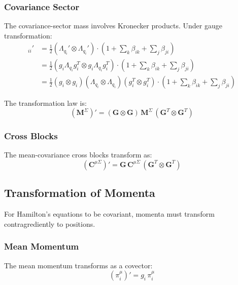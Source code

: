 \documentclass[12pt]{article}
\begin{document}
\subsubsection{Covariance Sector}

The covariance-sector mass involves Kronecker products. Under gauge transformation:
\begin{align}
[\mathbf{M}^\Sigma]_{ii}' &= \frac{1}{2}(\Lambda_{q_i}' \otimes \Lambda_{q_i}') \cdot \left(1 + \sum_k \beta_{ik} + \sum_j \beta_{ji}\right) \nonumber\\
&= \frac{1}{2}(g_i\Lambda_{q_i} g_i^T \otimes g_i\Lambda_{q_i} g_i^T) \cdot \left(1 + \sum_k \beta_{ik} + \sum_j \beta_{ji}\right) \nonumber\\
&= \frac{1}{2}(g_i \otimes g_i)(\Lambda_{q_i} \otimes \Lambda_{q_i})(g_i^T \otimes g_i^T) \cdot \left(1 + \sum_k \beta_{ik} + \sum_j \beta_{ji}\right)
\end{align}

The transformation law is:
\begin{equation}
\boxed{(\mathbf{M}^\Sigma)' = (\mathbf{G} \otimes \mathbf{G}) \, \mathbf{M}^\Sigma \, (\mathbf{G}^T \otimes \mathbf{G}^T)}
\end{equation}

\subsubsection{Cross Blocks}

The mean-covariance cross blocks transform as:
\begin{equation}
(\mathbf{C}^{\mu\Sigma})' = \mathbf{G} \, \mathbf{C}^{\mu\Sigma} \, (\mathbf{G}^T \otimes \mathbf{G}^T)
\end{equation}

\subsection{Transformation of Momenta}

For Hamilton's equations to be covariant, momenta must transform contragrediently to positions.

\subsubsection{Mean Momentum}

The mean momentum transforms as a covector:
\begin{equation}
\boxed{(\pi_i^\mu)' = g_i \, \pi_i^\mu}
\end{equation}
\end{document}
